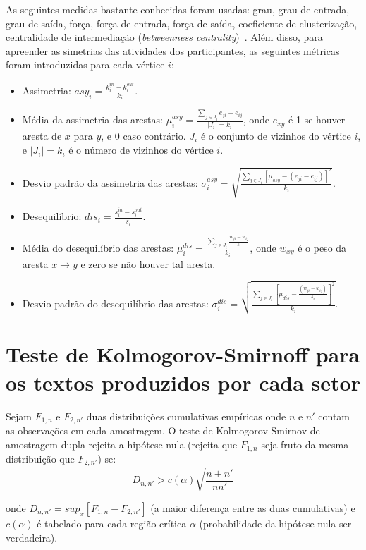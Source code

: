 \documentclass[a4paper,openright,12pt]{report} %
\begin{document}
As seguintes medidas bastante conhecidas foram usadas: grau, grau de entrada, grau de saída,
força, força de entrada, força de saída, coeficiente de clusterização,
centralidade de intermediação (\emph{betweenness centrality})~\cite{newmanBook}.
Além disso, para apreender as simetrias das atividades dos participantes, as
seguintes métricas foram introduzidas para cada vértice $i$:

\begin{itemize}
    \item Assimetria: $asy_i=\frac{k_i^{in}-k_i^{out}}{k_i}$.
    \item Média da assimetria das arestas: $\mu_i^{asy}=\frac{\sum_{j\in J_i} e_{ji}-e_{ij}}{|J_i|=k_i}$, onde $e_{xy}$ é 1 se houver aresta de $x$ para $y$, e $0$ caso contrário. $J_i$ é o conjunto de vizinhos do vértice $i$, e $|J_i|=k_i$ é o número de vizinhos do vértice $i$.
    \item Desvio padrão da assimetria das arestas: $\sigma_i^{asy}=\sqrt{\frac{\sum_{j\in J_i}[\mu_{asy} -(e_{ji}-e_{ij}) ]^2  }{k_i}  }$.
    \item Desequilíbrio: $dis_i=\frac{s_i^{in}-s_i^{out}}{s_i}$.
    \item Média do desequilíbrio das arestas: $\mu_i^{dis}=\frac{\sum_{j \in J_i}\frac{w_{ji}-w_{ij}}{s_i}}{k_i}$, onde $w_{xy}$ é o peso da aresta $x\rightarrow y$ e zero se não houver tal aresta.
    \item Desvio padrão do desequilíbrio das arestas: $\sigma_i^{dis}=\sqrt{\frac{\sum_{j\in J_i}[\mu_{dis}-\frac{(w_{ji}-w_{ij})}{s_i}]^2}{k_i}}$.
\end{itemize}

\section{Teste de Kolmogorov-Smirnoff para os textos produzidos por cada setor}\label{sec:kol}

Sejam $F_{1,n}$ e $F_{2,n'}$ duas distribuições cumulativas empíricas onde 
$n$ e $n'$ contam as observações em cada amostragem.
O teste de Kolmogorov-Smirnov de amostragem dupla 
rejeita a hipótese nula (rejeita que $F_{1,n}$ seja fruto da mesma distribuição que $F_{2,n'}$) se:
\begin{equation}\label{eq:ks}
D_{n,n'} > c(\alpha)\sqrt{\frac{n+n'}{nn'}}
\end{equation}

\noindent onde $D_{n,n'}=sup_x[F_{1,n}-F_{2,n'}]$ (a maior diferença entre as duas cumulativas) e $c(\alpha)$ é tabelado para cada região crítica $\alpha$
(probabilidade da hipótese nula ser verdadeira).
\end{document}
